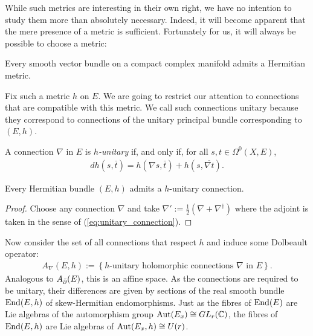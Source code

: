 \documentclass[12pt]{ociamthesis}  %
\begin{document}
While such metrics are interesting in their own right, we have no
intention to study them more than absolutely necessary. Indeed, it will
become apparent that the mere presence of a metric is sufficient.
Fortunately for us, it will always be possible to choose a metric:

\begin{theorem}\label{thm:hermitian_structures_exist}\missingcitation
  Every smooth vector bundle on a compact complex manifold admits a
  Hermitian metric.
\end{theorem}

Fix such a metric $h$ on $E$. We are going to restrict our attention to
connections that are compatible with this metric. We call such
connections unitary because they correspond to connections
of the unitary principal bundle corresponding to $(E,h)$.

\begin{definition}
  A connection $\nabla$ in $E$ is \emph{$h$-unitary}
  if, and only if, for all $s,t\in\Omega^0(X,E)$,
  \begin{align}\label{eq:unitary_connection}
    dh(s,\bar t) = h(\nabla s,\bar t) + h(s,\overline{\nabla t}).
  \end{align}
\end{definition}

\begin{lemma}
  Every Hermitian bundle $(E,h)$ admits a $h$-unitary connection.
  \begin{proof}
    Choose any connection $\nabla$ and take
    $\nabla' := \frac{1}{2}(\nabla + \nabla^\dagger)$
    where the adjoint is taken in the sense of
    (\ref{eq:unitary_connection}).
  \end{proof}
\end{lemma}

Now consider the set of all connections that respect $h$ and induce
some Dolbeault operator:
\begin{align*}
  A_\nabla(E,h) := \left\lbrace{\text{$h$-unitary holomorphic connections $\nabla$ in $E$}}\right\rbrace.
\end{align*}
Analogous to $A_{\bar{\partial}} (E)$, this is an affine space.
As the connections are required to be unitary, their differences
are given by sections of the real smooth bundle $\operatorname{End}(E,h)$ of
skew-Hermitian endomorphisms. Just as the fibres of $\operatorname{End}(E)$
are Lie algebras of the automorphism group $\operatorname{Aut}(E_x)\cong GL_r(\mathbb C)$,
the fibres of $\operatorname{End}(E,h)$ are Lie algebras of $\operatorname{Aut}(E_x,h)\cong U(r)$.
\end{document}
